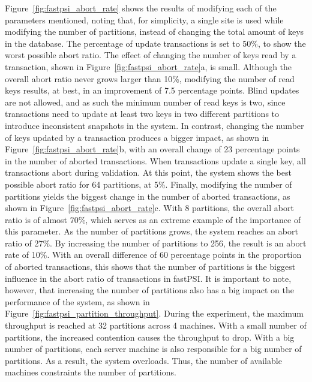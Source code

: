 Figure~\ref{fig:fastpsi_abort_rate} shows the results of modifying each of the parameters mentioned, noting that, for simplicity, a single site is used while modifying the number of partitions, instead of changing the total amount of keys in the database. The percentage of update transactions is set to 50\%, to show the worst possible abort ratio. The effect of changing the number of keys read by a transaction, shown in Figure~\ref{fig:fastpsi_abort_rate}a, is small. Although the overall abort ratio never grows larger than 10\%, modifying the number of read keys results, at best, in an improvement of 7.5 percentage points. Blind updates are not allowed, and as such the minimum number of read keys is two, since transactions need to update at least two keys in two different partitions to introduce inconsistent snapshots in the system. In contrast, changing the number of keys updated by a transaction produces a bigger impact, as shown in Figure~\ref{fig:fastpsi_abort_rate}b, with an overall change of 23 percentage points in the number of aborted transactions. When transactions update a single key, all transactions abort during validation. At this point, the system shows the best possible abort ratio for 64 partitions, at 5\%. Finally, modifying the number of partitions yields the biggest change in the number of aborted transactions, as shown in Figure~\ref{fig:fastpsi_abort_rate}c. With 8 partitions, the overall abort ratio is of almost 70\%, which serves as an extreme example of the importance of this parameter. As the number of partitions grows, the system reaches an abort ratio of 27\%. By increasing the number of partitions to 256, the result is an abort rate of 10\%. With an overall difference of 60 percentage points in the proportion of aborted transactions, this shows that the number of partitions is the biggest influence in the abort ratio of transactions in fastPSI. It is important to note, however, that increasing the number of partitions also has a big impact on the performance of the system, as shown in Figure~\ref{fig:fastpsi_partition_throughput}. During the experiment, the maximum throughput is reached at 32 partitions across 4 machines. With a small number of partitions, the increased contention causes the throughput to drop. With a big number of partitions, each server machine is also responsible for a big number of partitions. As a result, the system overloads. Thus, the number of available machines constraints the number of partitions.

